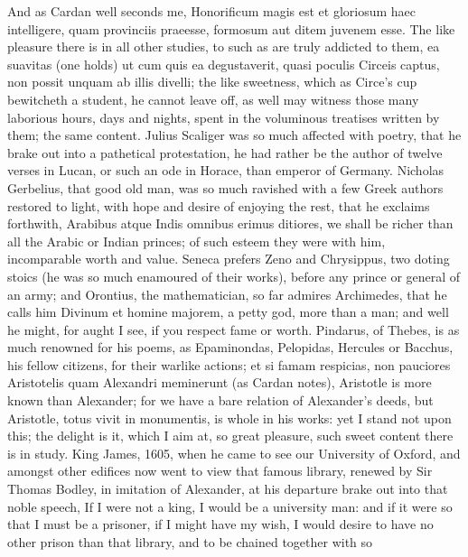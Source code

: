 {And as Cardan well seconds me, Honorificum magis est et gloriosum
haec intelligere, quam provinciis praeesse, formosum aut ditem juvenem
esse. The like pleasure there is in all other studies, to such as
are truly addicted to them, ea suavitas (one holds) ut cum quis
ea degustaverit, quasi poculis Circeis captus, non possit unquam ab
illis divelli; the like sweetness, which as Circe's cup bewitcheth a
student, he cannot leave off, as well may witness those many laborious
hours, days and nights, spent in the voluminous treatises written by
them; the same content. Julius Scaliger was so much affected with
poetry, that he brake out into a pathetical protestation, he had rather
be the author of twelve verses in Lucan, or such an ode in
Horace, than emperor of Germany. Nicholas Gerbelius, that
good old man, was so much ravished with a few Greek authors restored to
light, with hope and desire of enjoying the rest, that he exclaims
forthwith, Arabibus atque Indis omnibus erimus ditiores, we shall be
richer than all the Arabic or Indian princes; of such esteem they
were with him, incomparable worth and value. Seneca prefers Zeno and
Chrysippus, two doting stoics (he was so much enamoured of their
works), before any prince or general of an army; and Orontius, the
mathematician, so far admires Archimedes, that he calls him Divinum et
homine majorem, a petty god, more than a man; and well he might, for
aught I see, if you respect fame or worth. Pindarus, of Thebes, is as
much renowned for his poems, as Epaminondas, Pelopidas, Hercules or
Bacchus, his fellow citizens, for their warlike actions; et si famam
respicias, non pauciores Aristotelis quam Alexandri meminerunt (as
Cardan notes), Aristotle is more known than Alexander; for we have a
bare relation of Alexander's deeds, but Aristotle, totus vivit in
monumentis, is whole in his works: yet I stand not upon this; the
delight is it, which I aim at, so great pleasure, such sweet content
there is in study. King James, 1605, when he came to see our
University of Oxford, and amongst other edifices now went to view that
famous library, renewed by Sir Thomas Bodley, in imitation of
Alexander, at his departure brake out into that noble speech, If I were
not a king, I would be a university man:  and if it were so that
I must be a prisoner, if I might have my wish, I would desire to have
no other prison than that library, and to be chained together with so
}
